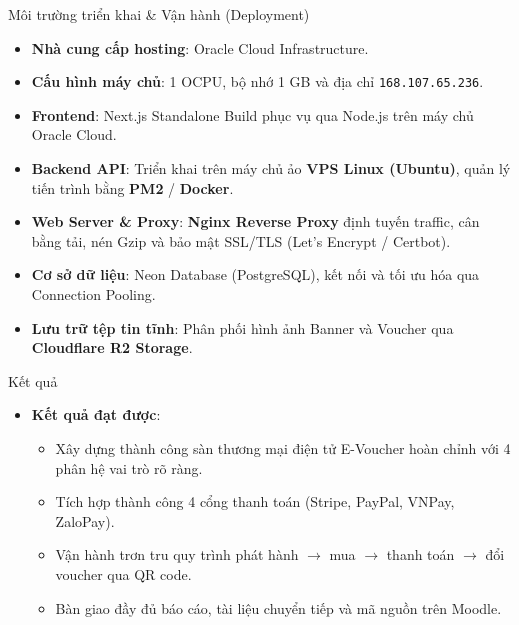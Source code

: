 \documentclass{beamer}
\begin{document}
\begin{frame}{Môi trường triển khai \& Vận hành (Deployment)}
\begin{itemize}
  \item \textbf{Nhà cung cấp hosting}: Oracle Cloud Infrastructure.
  \item \textbf{Cấu hình máy chủ}: 1 OCPU, bộ nhớ 1 GB và địa chỉ \texttt{168{.}107{.}65{.}236}.
  \item \textbf{Frontend}: Next.js Standalone Build phục vụ qua Node.js trên máy chủ Oracle Cloud.
  \item \textbf{Backend API}: Triển khai trên máy chủ ảo \textbf{VPS Linux (Ubuntu)}, quản lý tiến trình bằng \textbf{PM2} / \textbf{Docker}.
  \item \textbf{Web Server \& Proxy}: \textbf{Nginx Reverse Proxy} định tuyến traffic, cân bằng tải, nén Gzip và bảo mật SSL/TLS (Let's Encrypt / Certbot).
  \item \textbf{Cơ sở dữ liệu}: Neon Database (PostgreSQL), kết nối và tối ưu hóa qua Connection Pooling.
  \item \textbf{Lưu trữ tệp tin tĩnh}: Phân phối hình ảnh Banner và Voucher qua \textbf{Cloudflare R2 Storage}.
\end{itemize}
\end{frame}

\begin{frame}{Kết quả}
\begin{itemize}
  \item \textbf{Kết quả đạt được}:
    \begin{itemize}
      \item Xây dựng thành công sàn thương mại điện tử E-Voucher hoàn chỉnh với 4 phân hệ vai trò rõ ràng.
      \item Tích hợp thành công 4 cổng thanh toán (Stripe, PayPal, VNPay, ZaloPay).
      \item Vận hành trơn tru quy trình phát hành $\rightarrow$ mua $\rightarrow$ thanh toán $\rightarrow$ đổi voucher qua QR code.
      \item Bàn giao đầy đủ báo cáo, tài liệu chuyển tiếp và mã nguồn trên Moodle.
    \end{itemize}
\end{itemize}
\end{frame}
\end{document}
